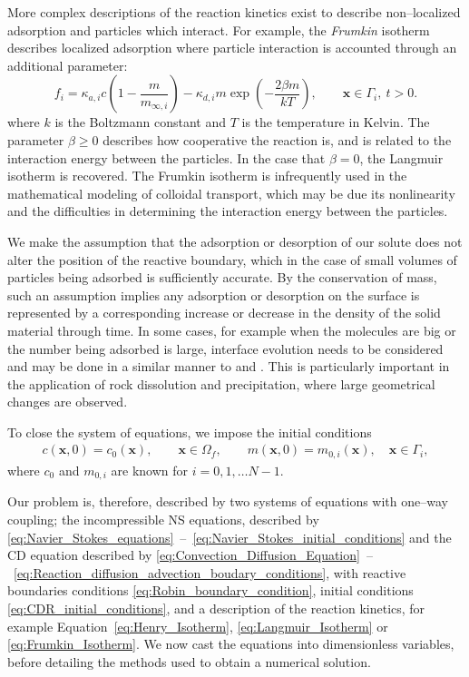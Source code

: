 \documentclass[preprint, 1p, authoryear]{elsarticle}
\begin{document}
More complex descriptions of the reaction kinetics exist to describe non--localized adsorption and particles which interact.  For example, the \emph{Frumkin} isotherm describes localized adsorption where particle interaction is accounted through an additional  parameter:
\begin{equation}
f_i = \kappa_{a,i} c\left( 1 - \frac{m}{m_{\infty,i}}\right) - \kappa_{d,i} m\exp\left( -\displaystyle \frac{2 \beta m}{kT} \right) , \qquad \mathbf{x} \in \Gamma_i, \: t > 0. \label{eq:Frumkin_Isotherm}
\end{equation} 
where   $k$ is the Boltzmann constant and $T$ is the temperature in Kelvin. The parameter $\beta\geq 0 $ describes how cooperative the reaction is, and is related to the interaction energy between the  particles. In the case that $\beta = 0$, the Langmuir isotherm is recovered.    The Frumkin isotherm is infrequently  used in the mathematical modeling of colloidal transport, which may be due its nonlinearity and the difficulties in determining the interaction energy between the particles. 





We make the assumption that the adsorption or desorption of our solute does not alter the position of the reactive boundary, which in the case of small volumes of particles being adsorbed is sufficiently accurate. By the conservation of mass,
such an assumption implies any adsorption or desorption on the surface is represented by a
corresponding increase or decrease in the density of the solid material through time. In some cases, for example when the molecules are big or the number being adsorbed is large, interface evolution needs to be considered and may be done in a similar manner to \citet{Tartakovsky2008Hybrid,Roubinet2013Hybrid} and \citet{Boso2013Homogenizability}. This is particularly important in the application of rock dissolution and precipitation, where large geometrical changes are observed. 


To close the system of equations, we impose the initial conditions 
\begin{align}
c(\mathbf{x}, 0) = c_0(\mathbf{x}), \qquad \mathbf{x} \in \Omega_f, \qquad m(\mathbf{x},0) = m_{0,i}(\mathbf{x}) , \quad \mathbf{x} \in \Gamma_i, \label{eq:CDR_initial_conditions}
\end{align}
where $c_0$ and $m_{0,i}$ are known for  $i = 0, 1, \ldots N-1$.  


Our problem is, therefore, described by two systems of equations with one--way coupling; the incompressible NS equations, described by \eqref{eq:Navier_Stokes_equations}~--~\eqref{eq:Navier_Stokes_initial_conditions} and the CD equation described by \eqref{eq:Convection_Diffusion_Equation}~--~\eqref{eq:Reaction_diffusion_advection_boudary_conditions},  with reactive boundaries conditions  \eqref{eq:Robin_boundary_condition},  initial conditions \eqref{eq:CDR_initial_conditions}, and a  description of the reaction kinetics, for example Equation~\eqref{eq:Henry_Isotherm}, \eqref{eq:Langmuir_Isotherm} or \eqref{eq:Frumkin_Isotherm}.  We now cast  the equations into dimensionless variables, before detailing the methods used to obtain a numerical solution. 
\end{document}
